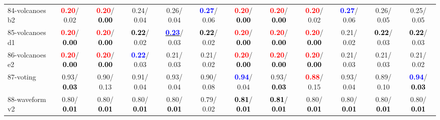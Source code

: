 \begin{table}[h]
\begin{center}
{\begin{tabular}{lc|c|c|c|c|c|c|c|c|c|c}
84-volcanoes b2 & \textcolor{red}{\textbf{  0.20}}/  0.02 & \textcolor{red}{\textbf{  0.20}}/\textcolor{black}{\textbf{  0.00}} &   0.24/  0.04 &   0.26/  0.04 & \textcolor{blue}{\textbf{  0.27}}/  0.06 & \textcolor{red}{\textbf{  0.20}}/\textcolor{black}{\textbf{  0.00}} & \textcolor{red}{\textbf{  0.20}}/\textcolor{black}{\textbf{  0.00}} & \textcolor{red}{\textbf{  0.20}}/  0.02 & \textcolor{blue}{\textbf{  0.27}}/  0.06 &   0.26/  0.05 &   0.25/  0.05 \\
85-volcanoes d1 & \textcolor{red}{\textbf{  0.20}}/\textcolor{black}{\textbf{  0.00}} & \textcolor{red}{\textbf{  0.20}}/\textcolor{black}{\textbf{  0.00}} & \textcolor{black}{\textbf{  0.22}}/  0.02 & \underline{\textcolor{blue}{\textbf{  0.23}}}/  0.03 & \textcolor{black}{\textbf{  0.22}}/  0.02 & \textcolor{red}{\textbf{  0.20}}/\textcolor{black}{\textbf{  0.00}} & \textcolor{red}{\textbf{  0.20}}/\textcolor{black}{\textbf{  0.00}} & \textcolor{red}{\textbf{  0.20}}/\textcolor{black}{\textbf{  0.00}} &   0.21/  0.02 & \textcolor{black}{\textbf{  0.22}}/  0.03 & \textcolor{black}{\textbf{  0.22}}/  0.03 \\ \hline
86-volcanoes e2 & \textcolor{red}{\textbf{  0.20}}/\textcolor{black}{\textbf{  0.00}} & \textcolor{red}{\textbf{  0.20}}/\textcolor{black}{\textbf{  0.00}} & \textcolor{blue}{\textbf{  0.22}}/  0.03 &   0.21/  0.03 &   0.21/  0.02 & \textcolor{red}{\textbf{  0.20}}/\textcolor{black}{\textbf{  0.00}} & \textcolor{red}{\textbf{  0.20}}/\textcolor{black}{\textbf{  0.00}} & \textcolor{red}{\textbf{  0.20}}/\textcolor{black}{\textbf{  0.00}} &   0.21/  0.03 &   0.21/  0.03 &   0.21/  0.02 \\
87-voting &   0.93/\textcolor{black}{\textbf{  0.03}} &   0.90/  0.13 &   0.91/  0.04 &   0.93/  0.04 &   0.90/  0.08 & \textcolor{blue}{\textbf{  0.94}}/  0.04 &   0.93/\textcolor{black}{\textbf{  0.03}} & \textcolor{red}{\textbf{  0.88}}/  0.15 &   0.93/  0.04 &   0.89/  0.10 & \textcolor{blue}{\textbf{  0.94}}/\textcolor{black}{\textbf{  0.03}} \\
88-waveform v2 &   0.80/\textcolor{black}{\textbf{  0.01}} &   0.80/\textcolor{black}{\textbf{  0.01}} &   0.80/\textcolor{black}{\textbf{  0.01}} &   0.80/\textcolor{black}{\textbf{  0.01}} &   0.79/  0.02 & \textcolor{black}{\textbf{  0.81}}/\textcolor{black}{\textbf{  0.01}} & \textcolor{black}{\textbf{  0.81}}/\textcolor{black}{\textbf{  0.01}} &   0.80/\textcolor{black}{\textbf{  0.01}} &   0.80/\textcolor{black}{\textbf{  0.01}} &   0.80/\textcolor{black}{\textbf{  0.01}} &   0.80/\textcolor{black}{\textbf{  0.01}} \\

\end{tabular}}
\end{center}
\end{table}
